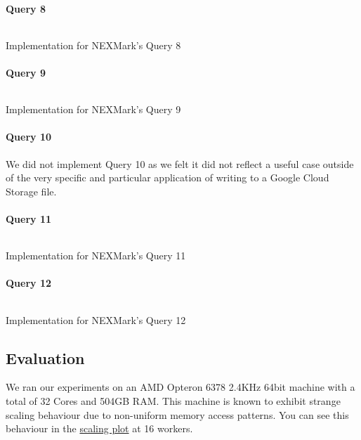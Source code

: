 \paragraph{Query 8}
\begin{listing}[H]
  \inputminted[firstline=670,lastline=679]{rust}{benchmarks/src/nexmark.rs}
  \caption{Implementation for NEXMark's Query 8}
  \label{lst:nexmark-query8}
\end{listing}

\paragraph{Query 9}
\begin{listing}[H]
  \inputminted[firstline=702,lastline=739]{rust}{benchmarks/src/nexmark.rs}
  \caption{Implementation for NEXMark's Query 9}
  \label{lst:nexmark-query9}
\end{listing}

\paragraph{Query 10}
We did not implement Query 10 as we felt it did not reflect a useful case outside of the very specific and particular application of writing to a Google Cloud Storage file.

\paragraph{Query 11}
\begin{listing}[H]
  \inputminted[firstline=784,lastline=787]{rust}{benchmarks/src/nexmark.rs}
  \caption{Implementation for NEXMark's Query 11}
  \label{lst:nexmark-query11}
\end{listing}

\paragraph{Query 12}
\begin{listing}[H]
  \inputminted[firstline=811,lastline=817]{rust}{benchmarks/src/nexmark.rs}
  \caption{Implementation for NEXMark's Query 12}
  \label{lst:nexmark-query12}
\end{listing}

\subsection{Evaluation}
We ran our experiments on an AMD Opteron 6378 2.4KHz 64bit machine with a total of 32 Cores and 504GB RAM. This machine is known to exhibit strange scaling behaviour due to non-uniform memory access patterns. You can see this behaviour in the \hyperref[figure:ysb-scaling]{scaling plot} at 16 workers. \\

